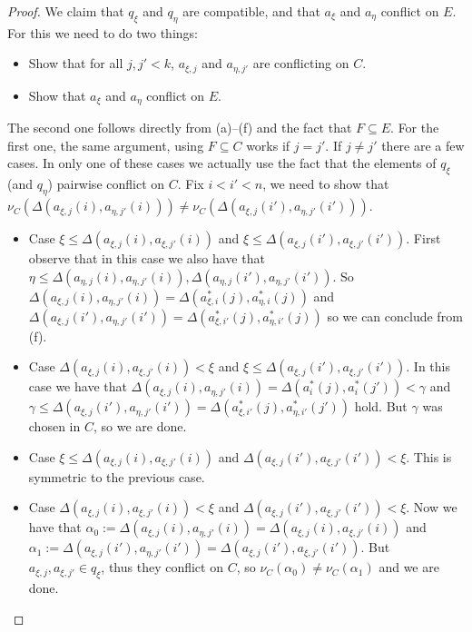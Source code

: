 \documentclass[a4paper,noamsfonts]{amsart}
\theoremstyle{definition}
\newcommand{\seb}{\subseteq}
\newcommand{\1}{\mathbf{1}}
\begin{document}
\begin{proof}
  We claim that $q_{\xi}$ and $q_{\eta}$ are compatible, and
  that $a_{\xi}$ and $a_{\eta}$ conflict on $E$. For this we need to do
  two things:
  \begin{itemize}
    \item Show that for all $j,j' < k$, $a_{\xi,j}$ and $a_{\eta,j'}$ are
    conflicting on $C$. 
    \item Show that $a_{\xi}$ and $a_{\eta}$ conflict on $E$.
  \end{itemize}
  The second one follows directly from (a)--(f) and the fact
  that $F  \seb E$. For the first one, the same argument, using $F \seb
  C$ works if $j = j'$. If $j \neq j'$ there are a few cases. In only
  one of these cases we actually use the fact that the elements of
  $q_{\xi}$ (and $q_{\eta}$) pairwise conflict on $C$. Fix $i < i' < n$,
  we need to show that $\nu_{C}(\Delta(a_{\xi,j}(i),a_{\eta,j'}(i)))
  \neq \nu_{C}(\Delta(a_{\xi,j}(i'),a_{\eta,j'}(i')))$.

  \begin{itemize}
    \item[$\blacktriangleright$] Case
    $\xi \le \Delta(a_{\xi,j}(i),a_{\xi,j'}(i))$ and
    $\xi \le \Delta(a_{\xi,j}(i'),a_{\xi,j'}(i'))$. First observe that
    in this case we also have
    that $\eta \le \Delta(a_{\eta,j}(i),a_{\eta,j'}(i)),
    \Delta(a_{\eta,j}(i'),a_{\eta,j'}(i'))$.
    So
    $\Delta(a_{\xi,j}(i),a_{\eta,j'}(i)) = \Delta(a^{*}_{\xi,i}(j),a^{*}_{\eta,i}(j))$
    and
    $\Delta(a_{\xi,j}(i'),a_{\eta,j'}(i')) = \Delta(a^{*}_{\xi,i'}(j),a^{*}_{\eta,i'}(j))$
    so we can conclude from (f).
    \item[$\blacktriangleright$] Case
    $\Delta(a_{\xi,j}(i),a_{\xi,j'}(i)) < \xi$ and
    $\xi \le \Delta(a_{\xi,j}(i'),a_{\xi,j'}(i'))$.
    In this case
    we have that $\Delta(a_{\xi,j}(i),a_{\eta,j'}(i)) =
    \Delta(a^{*}_{i}(j),a^{*}_{i}(j')) < \gamma$
    and $\gamma \le \Delta(a_{\xi,j}(i'),a_{\eta,j'}(i')) =
    \Delta(a^{*}_{\xi,i'}(j),a^{*}_{\eta,i'}(j'))$
    hold. But $\gamma$ was chosen in $C$, so we are done.
    \item[$\blacktriangleright$] Case
    $\xi \le \Delta(a_{\xi,j}(i),a_{\xi,j'}(i))$ and
    $\Delta(a_{\xi,j}(i'),a_{\xi,j'}(i')) < \xi$.
    This is symmetric to the previous
    case.
    \item[$\blacktriangleright$]
    Case $\Delta(a_{\xi,j}(i),a_{\xi,j'}(i)) < \xi$ and
    $\Delta(a_{\xi,j}(i'),a_{\xi,j'}(i')) < \xi$. Now
    we have that
    $\alpha_{0} := \Delta(a_{\xi,j}(i),a_{\eta,j'}(i))
    = \Delta(a_{\xi,j}(i),a_{\xi,j'}(i))$
    and $\alpha_{1} := \Delta(a_{\xi,j}(i'),a_{\eta,j'}(i'))
    = \Delta(a_{\xi,j}(i'),a_{\xi,j'}(i'))$.
    But $a_{\xi,j}, a_{\xi,j'} \in q_{\xi}$,
    thus they conflict on $C$, so $\nu_{C}(\alpha_{0})
    \neq \nu_{C}(\alpha_{1})$ and we are done.
  \end{itemize}


\end{proof}
\end{document}
